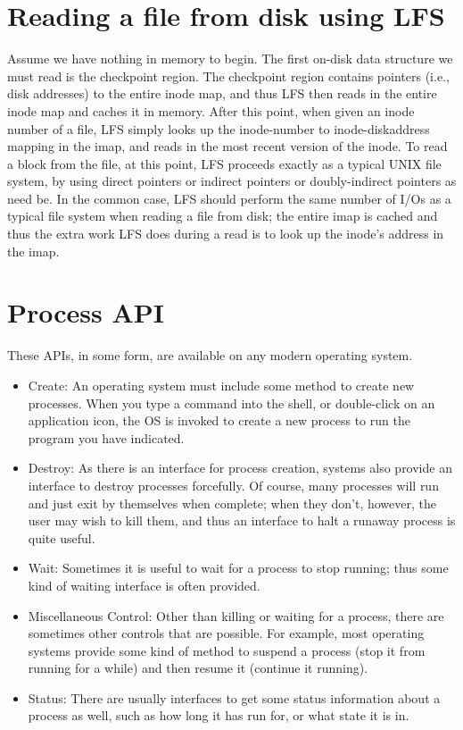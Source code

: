 \section*{Reading a file from disk using LFS}
Assume we have nothing in memory to begin. The first on-disk data structure we must read is the checkpoint region. The checkpoint region contains pointers (i.e., disk addresses) to the entire inode map, and thus LFS then reads in the entire inode map and caches it in memory. After this point, when given an inode number of a file, LFS simply looks up the inode-number to inode-diskaddress mapping in the imap, and reads in the most recent version of the inode. To read a block from the file, at this point, LFS proceeds exactly as a typical UNIX file system, by using direct pointers or indirect pointers or doubly-indirect pointers as need be. In the common case, LFS should perform the same number of I/Os as a typical file system when reading a file from disk; the entire imap is cached and thus the extra work LFS does during a read is to look up the inode’s address in the imap.
\section*{Process API}
These APIs, in some form, are available on any modern operating system.
\begin{itemize}
\item Create: An operating system must include some method to create new processes. When you type a command into the shell, or double-click on an application icon, the OS is invoked to create a new process to run the program you have indicated.
\item Destroy: As there is an interface for process creation, systems also provide an interface to destroy processes forcefully. Of course, many processes will run and just exit by themselves when complete; when they don’t, however, the user may wish to kill them, and thus an interface to halt a runaway process is quite useful.
\item Wait: Sometimes it is useful to wait for a process to stop running; thus some kind of waiting interface is often provided.
\item Miscellaneous Control: Other than killing or waiting for a process, there are sometimes other controls that are possible. For example, most operating systems provide some kind of method to suspend a process (stop it from running for a while) and then resume it (continue it running).
\item Status: There are usually interfaces to get some status information about a process as well, such as how long it has run for, or what state it is in.
\end{itemize}

